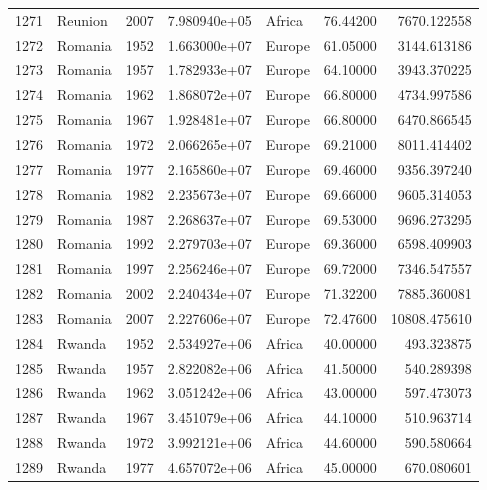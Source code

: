 \documentclass[
  letterpaper,
  DIV=11,
  numbers=noendperiod]{scrreprt}
\begin{document}
\begin{tabular}{llrrlrr}
1271 &                   Reunion &  2007 &  7.980940e+05 &    Africa &  76.44200 &    7670.122558 \\
1272 &                   Romania &  1952 &  1.663000e+07 &    Europe &  61.05000 &    3144.613186 \\
1273 &                   Romania &  1957 &  1.782933e+07 &    Europe &  64.10000 &    3943.370225 \\
1274 &                   Romania &  1962 &  1.868072e+07 &    Europe &  66.80000 &    4734.997586 \\
1275 &                   Romania &  1967 &  1.928481e+07 &    Europe &  66.80000 &    6470.866545 \\
1276 &                   Romania &  1972 &  2.066265e+07 &    Europe &  69.21000 &    8011.414402 \\
1277 &                   Romania &  1977 &  2.165860e+07 &    Europe &  69.46000 &    9356.397240 \\
1278 &                   Romania &  1982 &  2.235673e+07 &    Europe &  69.66000 &    9605.314053 \\
1279 &                   Romania &  1987 &  2.268637e+07 &    Europe &  69.53000 &    9696.273295 \\
1280 &                   Romania &  1992 &  2.279703e+07 &    Europe &  69.36000 &    6598.409903 \\
1281 &                   Romania &  1997 &  2.256246e+07 &    Europe &  69.72000 &    7346.547557 \\
1282 &                   Romania &  2002 &  2.240434e+07 &    Europe &  71.32200 &    7885.360081 \\
1283 &                   Romania &  2007 &  2.227606e+07 &    Europe &  72.47600 &   10808.475610 \\
1284 &                    Rwanda &  1952 &  2.534927e+06 &    Africa &  40.00000 &     493.323875 \\
1285 &                    Rwanda &  1957 &  2.822082e+06 &    Africa &  41.50000 &     540.289398 \\
1286 &                    Rwanda &  1962 &  3.051242e+06 &    Africa &  43.00000 &     597.473073 \\
1287 &                    Rwanda &  1967 &  3.451079e+06 &    Africa &  44.10000 &     510.963714 \\
1288 &                    Rwanda &  1972 &  3.992121e+06 &    Africa &  44.60000 &     590.580664 \\
1289 &                    Rwanda &  1977 &  4.657072e+06 &    Africa &  45.00000 &     670.080601 \\

\end{tabular}
\end{document}
